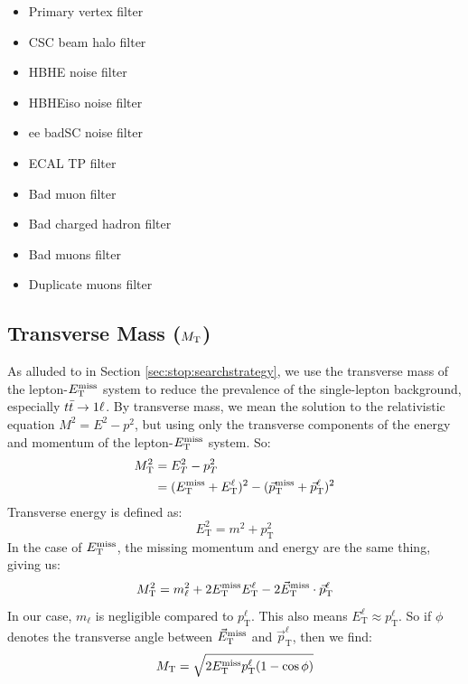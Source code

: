 \begin{itemize}
\item Primary vertex filter
\item CSC beam halo filter
\item HBHE noise filter
\item HBHEiso noise filter
\item ee badSC noise filter
\item ECAL TP filter
\item Bad muon filter
\item Bad charged hadron filter
\item Bad muons filter
\item Duplicate muons filter
\end{itemize}

\subsection{Transverse Mass (\texorpdfstring{$M_\text{T}$}{MT})}
\label{ssec:stop:mt}

As alluded to in Section \ref{sec:stop:searchstrategy}, we use the
transverse mass of the lepton-$E_\text{T}^\text{miss}$ system to reduce the prevalence of
the single-lepton background, especially $t\bar{t} \rightarrow 1\ell$. By transverse
mass, we mean the solution to the relativistic equation $M^2 = E^2 -
p^2$, but using only the transverse components of the energy and
momentum of the lepton-$E_\text{T}^\text{miss}$ system. So:
\begin{equation}
\begin{split}
M_\text{T}^2 & = E_T^2 - p_T^2 \\
 & = (E_\text{T}^\text{miss} + E_\text{T}^\ell)^2 - (\vec{p}_\text{T}^\text{miss} + \vec{p}_\text{T}^\ell)^2
\end{split}
\end{equation}
Transverse energy is defined as:
\begin{equation}
E_\text{T}^2 = m^2 + p_\text{T}^2
\end{equation}
In the case of $E_\text{T}^\text{miss}$, the missing momentum and energy are the same
thing, giving us:
\begin{equation}
M_\text{T}^2 = m_\ell^2 + 2E_\text{T}^\text{miss} E_\text{T}^\ell - 2 \vec{E}_\text{T}^\text{miss} \cdot \vec{p}_\text{T}^\ell
\end{equation}
In our case, $m_\ell$ is negligible compared to
$p_\text{T}^\ell$. This also means $E_\text{T}^\ell \approx p_\text{T}^\ell$.
So if $\phi$ denotes the transverse angle between $\vec{E}_\text{T}^\text{miss}$ and
$\vec{p}_\text{T}^\ell$, then we find:
\begin{equation}
\label{eq:stop:mt}
M_\text{T} = \sqrt{2 E_\text{T}^\text{miss} p_\text{T}^\ell (1 - \cos \phi)}
\end{equation}

